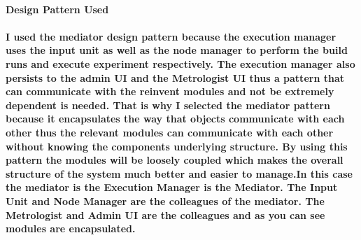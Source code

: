     \paragraph{\textbf{Design Pattern Used} \\ \\
	I used the mediator design pattern because the execution manager uses the input unit as well as the node manager to perform the build runs and execute experiment respectively. The execution manager also persists to the admin UI and the Metrologist UI thus a pattern that can communicate with the reinvent modules and not be extremely dependent is needed. That is why I selected the mediator pattern because it encapsulates the way that objects communicate with each other thus the relevant modules can communicate with each other without knowing the components underlying structure. By using this pattern the modules will be loosely coupled which makes the overall structure of the system much better and easier to manage.In this case the mediator is the \textbf{Execution Manager}  is the Mediator. The \textbf{Input Unit} and \textbf{Node Manager } are the colleagues of the mediator. The \textbf{Metrologist} and \textbf{Admin UI} are the colleagues and as you can see modules are encapsulated.}
		
